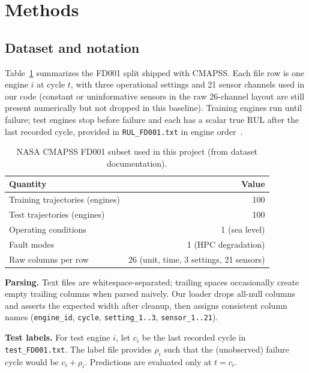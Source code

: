 \documentclass[11pt]{article}
\begin{document}
\section{Methods}

\subsection{Dataset and notation}
Table~\ref{tab:ds} summarizes the FD001 split shipped with CMAPSS. Each file row is one engine $i$ at cycle $t$, with three operational settings and 21 sensor channels used in our code (constant or uninformative sensors in the raw 26-channel layout are still present numerically but not dropped in this baseline). Training engines run until failure; test engines stop before failure and each has a scalar true RUL after the last recorded cycle, provided in \texttt{RUL\_FD001.txt} in engine order~\cite{saxena2008damage}.

\begin{table}[ht]
  \centering
  \caption{NASA CMAPSS FD001 subset used in this project (from dataset documentation).}
  \label{tab:ds}
  \begin{tabular}{lr}
    \toprule
    Quantity & Value \\
    \midrule
    Training trajectories (engines) & 100 \\
    Test trajectories (engines) & 100 \\
    Operating conditions & 1 (sea level) \\
    Fault modes & 1 (HPC degradation) \\
    Raw columns per row & 26 (unit, time, 3 settings, 21 sensors) \\
    \bottomrule
  \end{tabular}
\end{table}

\textbf{Parsing.} Text files are whitespace-separated; trailing spaces occasionally create empty trailing columns when parsed naively. Our loader drops all-null columns and asserts the expected width after cleanup, then assigns consistent column names (\texttt{engine\_id}, \texttt{cycle}, \texttt{setting\_1..3}, \texttt{sensor\_1..21}).

\textbf{Test labels.} For test engine $i$, let $c_i$ be the last recorded cycle in \texttt{test\_FD001.txt}. The label file provides $\rho_i$ such that the (unobserved) failure cycle would be $c_i + \rho_i$. Predictions are evaluated only at $t=c_i$.
\end{document}
